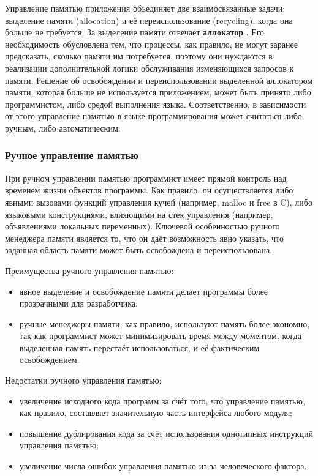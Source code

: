 Управление памятью приложения объединяет две взаимосвязанные задачи: выделение памяти (allocation) и её переиспользование (recycling), когда она больше не требуется. За выделение памяти отвечает \textbf{аллокатор} \cite{allocator}. Его необходимость обусловлена тем, что процессы, как правило, не могут заранее предсказать, сколько памяти им потребуется, поэтому они нуждаются в реализации дополнительной логики обслуживания изменяющихся запросов к памяти. Решение об освобождении и переиспользовании выделенной аллокатором памяти, которая больше не используется приложением, может быть принято либо программистом, либо средой выполнения языка. Соответственно, в зависимости от этого управление памятью в языке программирования может считаться либо ручным, либо автоматическим.

\subsubsection{Ручное управление памятью}

При ручном управлении памятью программист имеет прямой контроль над временем жизни объектов программы. Как правило, он осуществляется либо явными вызовами функций управления кучей (например, malloc и free в C), либо языковыми конструкциями, влияющими на стек управления (например, объявлениями локальных переменных). Ключевой особенностью ручного менеджера памяти является то, что он даёт возможность явно указать, что заданная область памяти может быть освобождена и переиспользована. \cite{mm_overview}

Преимущества ручного управления памятью: 

\begin{itemize}[label*=---]
	\item явное выделение и освобождение памяти делает программы более прозрачными для разработчика;
	\item ручные менеджеры памяти, как правило, используют память более экономно, так как программист может минимизировать время между моментом, когда выделенная память перестаёт использоваться, и её фактическим освобождением.
\end{itemize}

Недостатки ручного управления памятью: 

\begin{itemize}[label*=---]
	\item увеличение исходного кода программ за счёт того, что управление памятью, как правило, составляет значительную часть интерфейса любого модуля;
	\item повышение дублирования кода за счёт использования однотипных инструкций управления памятью;
	\item увеличение числа ошибок управления памятью из-за человеческого фактора.
\end{itemize}

